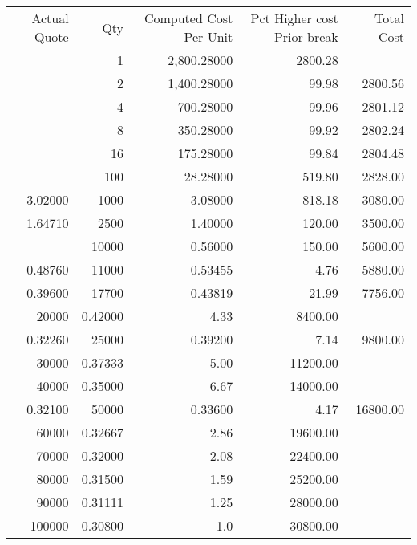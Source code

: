 \documentclass[a4paper,10pt]{article}
\begin{document}
\begin{tabular}{ r | r | r | r | r}
Actual Quote & Qty & Computed Cost Per Unit & Pct Higher cost Prior break &    Total Cost \\
  &  1 & 2,800.28000&2800.28 \\
  &  2 & 1,400.28000&99.98&2800.56 \\
  &  4 & 700.28000&99.96&2801.12 \\
  &  8 & 350.28000&99.92&2802.24 \\
  & 16 & 175.28000&99.84&2804.48 \\
  &  100 & 28.28000&519.80&2828.00 \\
3.02000 & 1000&3.08000&818.18&3080.00 \\
1.64710 & 2500&1.40000&120.00&3500.00 \\
  &  10000 & 0.56000&150.00&5600.00 \\
0.48760&11000&0.53455&4.76&5880.00 \\
0.39600&17700&0.43819&21.99&7756.00 \\
    20000&0.42000&4.33&8400.00 \\
0.32260&25000&0.39200&7.14&9800.00 \\
    30000&0.37333&5.00&11200.00 \\
    40000&0.35000&6.67&14000.00 \\
0.32100&50000&0.33600&4.17&16800.00 \\
    60000&0.32667&2.86&19600.00 \\
    70000&0.32000&2.08&22400.00 \\
    80000&0.31500&1.59&25200.00 \\
    90000&0.31111&1.25&28000.00 \\
    100000&0.30800&1.0&30800.00 \\
\end{tabular}
\end{document}
